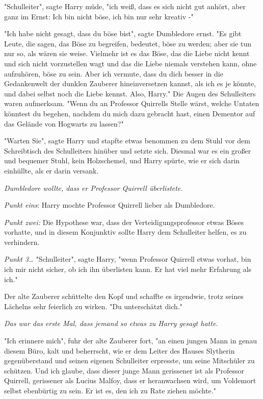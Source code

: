 {"Schulleiter", sagte Harry müde, "ich weiß, dass es sich nicht gut anhört, aber ganz im Ernst: Ich bin nicht böse, ich bin nur sehr kreativ -"

"Ich habe nicht gesagt, dass du böse bist", sagte Dumbledore ernst. "Es gibt Leute, die sagen, das Böse zu begreifen, bedeutet, böse zu werden; aber sie tun nur so, als wären sie weise. Vielmehr ist es das Böse, das die Liebe nicht kennt und sich nicht vorzustellen wagt und das die Liebe niemals verstehen kann, ohne aufzuhören, böse zu sein. Aber ich vermute, dass du dich besser in die Gedankenwelt der dunklen Zauberer hineinversetzen kannst, als ich es je könnte, und dabei selbst noch die Liebe kennst. Also, Harry." Die Augen des Schulleiters waren aufmerksam. "Wenn du an Professor Quirrells Stelle wärst, welche Untaten könntest du begehen, nachdem du mich dazu gebracht hast, einen Dementor auf das Gelände von Hogwarts zu lassen?"

"Warten Sie", sagte Harry und stapfte etwas benommen zu dem Stuhl vor dem Schreibtisch des Schulleiters hinüber und setzte sich. Diesmal war es ein großer und bequemer Stuhl, kein Holzschemel, und Harry spürte, wie er sich darin einhüllte, als er darin versank.

\emph{Dumbledore wollte, dass er Professor Quirrell überlistete.}

\emph{Punkt eins}: Harry mochte Professor Quirrell lieber als Dumbledore.

\emph{Punkt zwei:} Die Hypothese war, dass der Verteidigungsprofessor etwas Böses vorhatte, und in diesem Konjunktiv sollte Harry dem Schulleiter helfen, es zu verhindern.

\emph{Punkt 3…} "Schulleiter", sagte Harry, "wenn Professor Quirrell etwas vorhat, bin ich mir nicht sicher, ob ich ihn überlisten kann. Er hat viel mehr Erfahrung als ich."

Der alte Zauberer schüttelte den Kopf und schaffte es irgendwie, trotz seines Lächelns sehr feierlich zu wirken. "Du unterschätzt dich."

\emph{Das war das erste Mal, dass jemand so etwas zu Harry gesagt hatte.}

"Ich erinnere mich", fuhr der alte Zauberer fort, "an einen jungen Mann in genau diesem Büro, kalt und beherrscht, wie er dem Leiter des Hauses Slytherin gegenüberstand und seinen eigenen Schulleiter erpresste, um seine Mitschüler zu schützen. Und ich glaube, dass dieser junge Mann gerissener ist als Professor Quirrell, gerissener als Lucius Malfoy, dass er heranwachsen wird, um Voldemort selbst ebenbürtig zu sein. Er ist es, den ich zu Rate ziehen möchte."

}
